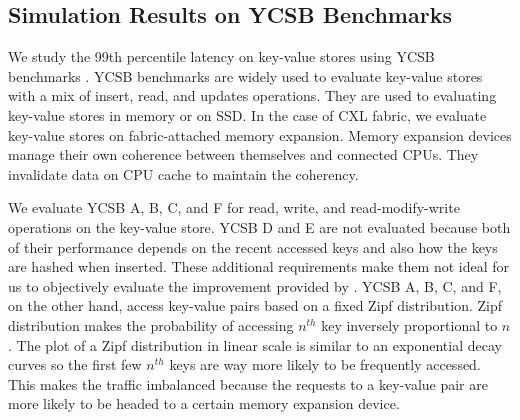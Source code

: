 \subsection{Simulation Results on YCSB Benchmarks}
\label{aurelia:sec:eval:kv-store}
%
We study the 99th percentile latency on key-value stores using YCSB benchmarks \cite{ycsb:socc:2010}.
%
YCSB benchmarks are widely used to evaluate key-value stores with a mix of insert, read, and updates operations.
%
They are used to evaluating key-value stores in memory or on SSD.
%
In the case of CXL fabric, we evaluate key-value stores on fabric-attached memory expansion.
%
Memory expansion devices manage their own coherence between themselves and connected CPUs.
%
They invalidate data on CPU cache to maintain the coherency.

We evaluate YCSB A, B, C, and F for read, write, and read-modify-write operations on the key-value store.
%
YCSB D and E are not evaluated because both of their performance depends on the recent accessed keys and also how the keys are hashed when inserted. 
%
These additional requirements make them not ideal for us to objectively evaluate the improvement provided by \aurelia.
%
YCSB A, B, C, and F, on the other hand, access key-value pairs based on a fixed Zipf distribution.
%
Zipf distribution makes the probability of accessing $n^{th}$ key inversely proportional to $n$.
%
The plot of a Zipf distribution in linear scale is similar to an exponential decay curves so the first few $n^{th}$ keys are way more likely to be frequently accessed.
%
This makes the traffic imbalanced because the requests to a key-value pair are more likely to be headed to a certain memory expansion device. 


